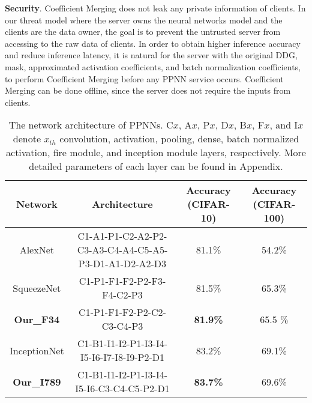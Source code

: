 \documentclass{article}
\begin{document}
  
\textbf{Security}. Coefficient Merging does not leak any private information of clients. In our threat model where the server owns the neural networks model and the clients are the data owner, the goal is to prevent the untrusted server from accessing to the raw data of clients. In order to obtain higher inference accuracy and reduce inference latency, it is natural for the server with the original DDG, mask, approximated activation coefficients, and batch normalization coefficients, to perform Coefficient Merging before any PPNN service occurs. Coefficient Merging can be done offline, since the server does not require the inputs from clients.
	
	
	
	
	
	
	
	
	
	
	
	
	
	
	
	
	
	
	
	
	
	
	\begin{table*}[t!]
	\centering
	\footnotesize
		\setlength{\tabcolsep}{3pt}
		\begin{tabular}{|c||c|c|c|} \hline
			Network                 & Architecture                                                          & Accuracy (CIFAR-10) & Accuracy (CIFAR-100)\\\hline\hline
			AlexNet                 & C1-A1-P1-C2-A2-P2-C3-A3-C4-A4-C5-A5-P3-D1-A1-D2-A2-D3                 & 81.1\%        & 54.2\%  \\\hline
			SqueezeNet              & C1-P1-F1-F2-P2-F3-F4-C2-P3                                            & 81.5\%        & 65.3\%\\\hline	
			\textbf{Our\_F34}   & C1-P1-F1-F2-P2-C2-C3-C4-P3                                                & \textbf{81.9\%}   & 65.5 \%      \\\hline \hline
			InceptionNet            & C1-B1-I1-I2-P1-I3-I4-I5-I6-I7-I8-I9-P2-D1                             & 83.2\%         &69.1\%\\\hline	
			\textbf{Our\_I789} & C1-B1-I1-I2-P1-I3-I4-I5-I6-C3-C4-C5-P2-D1                                  & \textbf{83.7\%}      & 69.6\%      \\\hline
		\end{tabular}
		\caption{The network architecture of PPNNs. C$x$, A$x$, P$x$, D$x$, B$x$, F$x$, and I$x$ denote $x_{th}$ convolution, activation, pooling, dense, batch normalized activation, fire module, and inception module layers, respectively. More detailed parameters of each layer can be found in Appendix.}
		\label{t:Networks}
	\end{table*}
	
\end{document}
